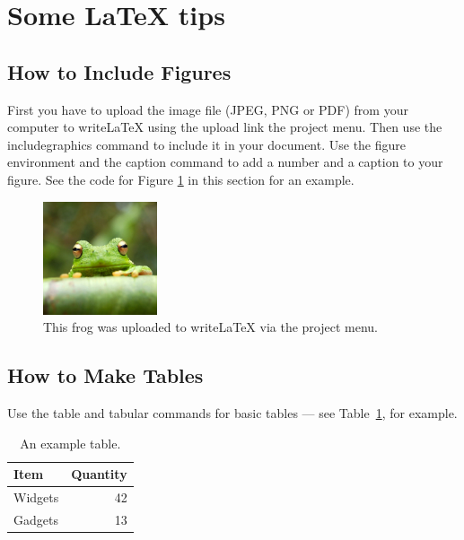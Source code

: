 \documentclass[a4paper]{article}
\begin{document}



























\newpage
\section{Some LaTeX tips}
\label{sec:latex}
\subsection{How to Include Figures}

First you have to upload the image file (JPEG, PNG or PDF) from your computer to writeLaTeX using the upload link the project menu. Then use the includegraphics command to include it in your document. Use the figure environment and the caption command to add a number and a caption to your figure. See the code for Figure \ref{fig:frog} in this section for an example.

\begin{figure}[ht]
\centering
\includegraphics[width=0.3\textwidth]{frog.jpg}
\caption{\label{fig:frog}This frog was uploaded to writeLaTeX via the project menu.}
\end{figure}

\subsection{How to Make Tables}

Use the table and tabular commands for basic tables --- see Table~\ref{tab:widgets}, for example.

\begin{table}[ht]
\centering
\begin{tabular}{l|r}
Item & Quantity \\\hline
Widgets & 42 \\
Gadgets & 13
\end{tabular}
\caption{\label{tab:widgets}An example table.}
\end{table}
\end{document}
